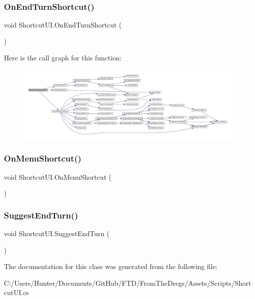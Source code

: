 \subsubsection{\texorpdfstring{OnEndTurnShortcut()}{OnEndTurnShortcut()}}
{\footnotesize\ttfamily void Shortcut\+U\+I.\+On\+End\+Turn\+Shortcut (\begin{DoxyParamCaption}{ }\end{DoxyParamCaption})}

Here is the call graph for this function\+:
\nopagebreak
\begin{figure}[H]
\begin{center}
\leavevmode
\includegraphics[width=350pt]{class_shortcut_u_i_ac6c1705acfb6d8393f36a73810d94958_cgraph}
\end{center}
\end{figure}
\mbox{\label{class_shortcut_u_i_a71824a1037ebef08af0938c0d731a498}} 
\subsubsection{\texorpdfstring{OnMenuShortcut()}{OnMenuShortcut()}}
{\footnotesize\ttfamily void Shortcut\+U\+I.\+On\+Menu\+Shortcut (\begin{DoxyParamCaption}{ }\end{DoxyParamCaption})}

\mbox{\label{class_shortcut_u_i_a501d7c10166dca42125d04c805c617d1}} 
\subsubsection{\texorpdfstring{SuggestEndTurn()}{SuggestEndTurn()}}
{\footnotesize\ttfamily void Shortcut\+U\+I.\+Suggest\+End\+Turn (\begin{DoxyParamCaption}{ }\end{DoxyParamCaption})}



The documentation for this class was generated from the following file\+:\begin{DoxyCompactItemize}
\item 
C\+:/\+Users/\+Hunter/\+Documents/\+Git\+Hub/\+F\+T\+D/\+From\+The\+Dregs/\+Assets/\+Scripts/Shortcut\+U\+I.\+cs\end{DoxyCompactItemize}
